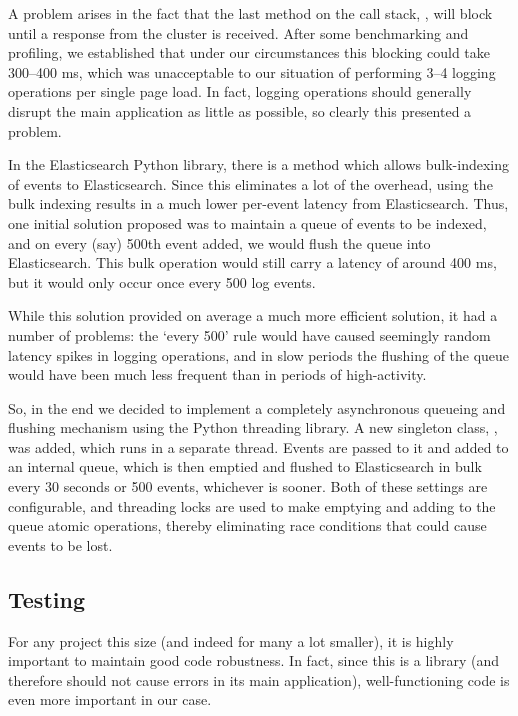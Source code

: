 \documentclass[a4paper,11pt]{article} %
\begin{document}
A problem arises in the fact that the last method on the call stack,
, will block until a response from the cluster is received.
After some benchmarking and profiling, we established that under our
circumstances this blocking could take 300--400 ms, which was unacceptable to
our situation of performing 3--4 logging operations per single page load.  In
fact, logging operations should generally disrupt the main application as
little as possible, so clearly this presented a problem.

In the Elasticsearch Python library, there is a method  which
allows bulk-indexing of events to Elasticsearch.  Since this eliminates a lot
of the overhead, using the bulk indexing results in a much lower per-event
latency from Elasticsearch.  Thus, one initial solution proposed was to
maintain a queue of events to be indexed, and on every (say) 500th event added,
we would flush the queue into Elasticsearch.  This bulk operation would still
carry a latency of around 400 ms, but it would only occur once every 500 log
events.

While this solution provided on average a much more efficient solution, it had
a number of problems: the `every 500' rule would have caused seemingly random
latency spikes in logging operations, and in slow periods the flushing of the
queue would have been much less frequent than in periods of high-activity.

So, in the end we decided to implement a completely asynchronous queueing and
flushing mechanism using the Python threading library.  A new singleton class,
, was added, which runs in a separate thread.  Events are
passed to it and added to an internal queue, which is then emptied and flushed
to Elasticsearch in bulk every 30 seconds or 500 events, whichever is sooner.
Both of these settings are configurable, and threading locks are used to make
emptying and adding to the queue atomic operations, thereby eliminating race
conditions that could cause events to be lost.



\subsection{Testing}
\label{sec:implementation.tdd}
For any project this size (and indeed for many a lot smaller), it is highly
important to maintain good code robustness.  In fact, since this is a library
(and therefore should not cause errors in its main application),
well-functioning code is even more important in our case.
\end{document}
